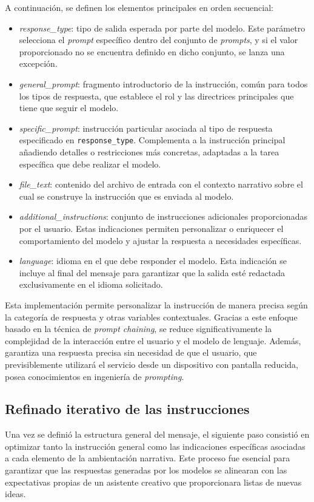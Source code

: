 A continuación, se definen los elementos principales en orden secuencial:
\begin{itemize}
\item \textit{response\_type}:
tipo de salida esperada por parte del modelo.
Este parámetro selecciona el \textit{prompt} específico dentro del conjunto de \textit{prompts},
y si el valor proporcionado no se encuentra definido en dicho conjunto, se lanza una excepción.
\item \textit{general\_prompt}:
fragmento introductorio de la instrucción, común para todos los tipos de respuesta, que establece el rol
y las directrices principales que tiene que seguir el modelo.
\item \textit{specific\_prompt}:
instrucción particular asociada al tipo de respuesta especificado en \texttt{response\_type}.
Complementa a la instrucción principal añadiendo detalles o restricciones más concretas,
adaptadas a la tarea específica que debe realizar el modelo.
\item \textit{file\_text}:
contenido del archivo de entrada con el contexto narrativo sobre el cual se construye
la instrucción que es enviada al modelo.
\item \textit{additional\_instructions}:
conjunto de instrucciones adicionales proporcionadas por el usuario.
Estas indicaciones permiten personalizar o enriquecer el comportamiento del modelo
y ajustar la respuesta a necesidades específicas.
\item \textit{language}:
idioma en el que debe responder el modelo.
Esta indicación se incluye al final del mensaje para garantizar que
la salida esté redactada exclusivamente en el idioma solicitado.
\end{itemize}

Esta implementación permite personalizar la instrucción de manera precisa según la categoría de respuesta
y otras variables contextuales.
Gracias a este enfoque basado en la técnica de \textit{prompt chaining},
se reduce significativamente la complejidad de la interacción entre el usuario y el modelo de lenguaje.
Además, garantiza una respuesta precisa sin necesidad de que el usuario, 
que previsiblemente utilizará el servicio desde un dispositivo con pantalla reducida,
posea conocimientos en ingeniería de \textit{prompting}.

\subsection{Refinado iterativo de las instrucciones}
Una vez se definió la estructura general del mensaje, el siguiente paso consistió en optimizar tanto la instrucción general
como las indicaciones específicas asociadas a cada elemento de la ambientación narrativa. 
Este proceso fue esencial para garantizar que las respuestas generadas por los modelos se alinearan con las
expectativas propias de un asistente creativo que proporcionara listas de nuevas ideas.

